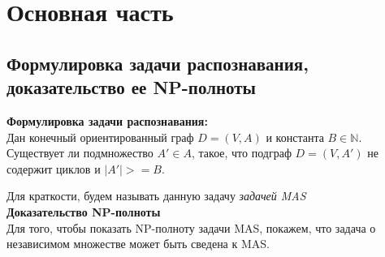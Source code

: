 
\section{Основная часть}
\subsection{Формулировка задачи распознавания, доказательство ее NP-полноты}

\textbf{Формулировка задачи распознавания:} \\

Дан конечный ориентированный граф $D = (V, A)$ и константа $B \in \mathbb{N}$.
Существует ли подмножество $A' \in A$, такое, что подграф $D = (V, A')$ не
содержит циклов и $|A'| >= B$. 

Для краткости, будем называть данную задачу \textit{задачей MAS} \\

\textbf{Доказательство NP-полноты} \\

Для того, чтобы показать NP-полноту задачи MAS, покажем, что задача о 
независимом множестве может быть сведена к MAS.
